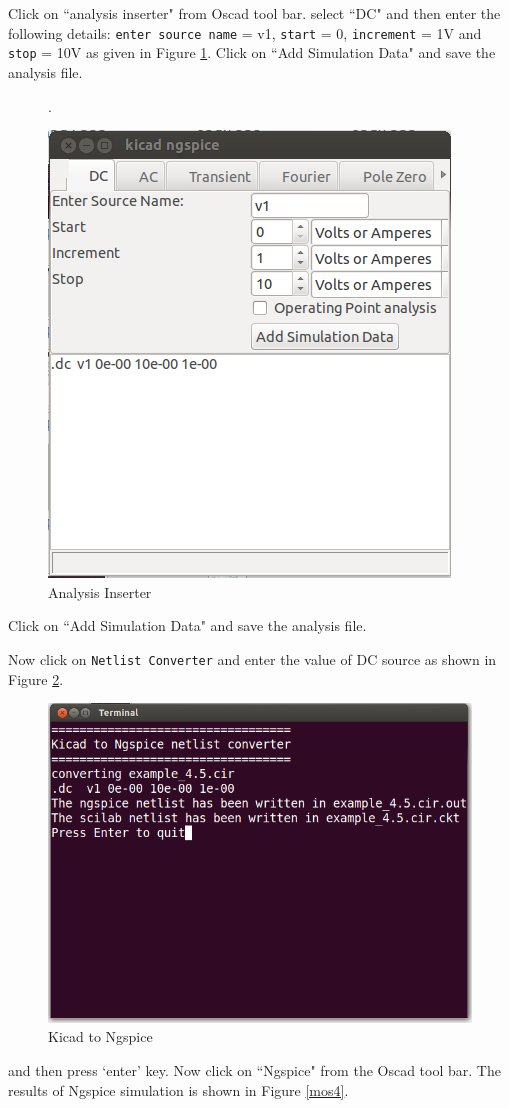 Click on ``analysis inserter" from Oscad tool bar.
select ``DC" and then enter the following details:
{\tt enter source name} = v1, {\tt start} = 0, {\tt increment} = 1V and {\tt stop} = 10V as given in Figure \ref{mos2}. Click on ``Add Simulation Data" and save the analysis file. 
\begin{figure}.
\begin{center}
\includegraphics[width=0.6\linewidth]{figures/mosfet2.png}
\caption{Analysis Inserter}
\label{mos2}
\end{center}
\end{figure}
Click on ``Add Simulation Data" and save the analysis file.

Now click on {\tt Netlist Converter} and enter the value of DC source as shown in Figure \ref{mos3}.
\begin{figure}
\begin{center}
\includegraphics[width=1\linewidth]{figures/mosfet3.png}
\caption{Kicad to Ngspice}
\label{mos3}
\end{center}
\end{figure}
and then press `enter' key. Now click on ``Ngspice" from the Oscad tool bar. The results of Ngspice simulation is shown in Figure \ref{mos4}.

